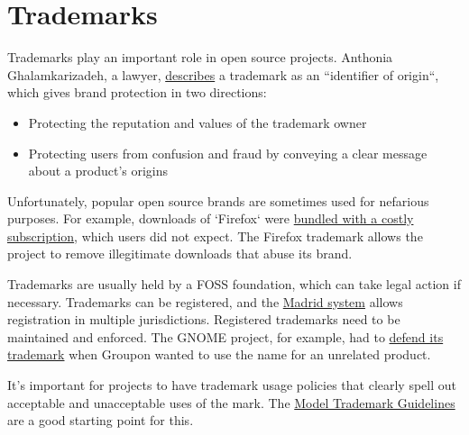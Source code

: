


\chapter{Trademarks}

Trademarks play an important role in open source projects.  Anthonia Ghalamkarizadeh, a lawyer, \href{https://lwn.net/Articles/546678/}{describes} a trademark as an ``identifier of origin``, which gives brand protection in two directions:

\begin{itemize}

\itemsep 0.50em

\item Protecting the reputation and values of the trademark owner

\item Protecting users from confusion and fraud by conveying a clear message about a product's origins

\end{itemize}

Unfortunately, popular open source brands are sometimes used for nefarious purposes.  For example, downloads of `Firefox` were \href{https://lwn.net/Articles/546678/}{bundled with a costly subscription}, which users did not expect.  The Firefox trademark allows the project to remove illegitimate downloads that abuse its brand.

Trademarks are usually held by a FOSS foundation, which can take legal action if necessary.  Trademarks can be registered, and the \href{https://en.wikipedia.org/wiki/Madrid_system}{Madrid system} allows registration in multiple jurisdictions.  Registered trademarks need to be maintained and enforced.  The GNOME project, for example, had to \href{https://lwn.net/Articles/654124/}{defend its trademark} when Groupon wanted to use the name for an unrelated product.

It's important for projects to have trademark usage policies that clearly spell out acceptable and unacceptable uses of the mark.  The \href{http://modeltrademarkguidelines.org/}{Model Trademark Guidelines} are a good starting point for this.

\newpage

